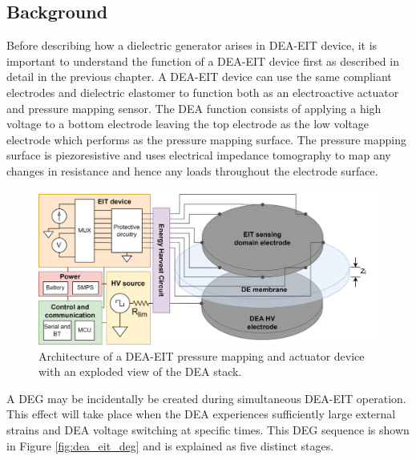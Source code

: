 \subsection{Background} 
\label{subsec:background}
Before describing how a dielectric generator arises in DEA-EIT device, it is important to understand the function of a DEA-EIT device first as  described in detail in the previous chapter. A DEA-EIT device can use the same compliant electrodes and dielectric elastomer to function both as an electroactive actuator and pressure mapping sensor. The DEA function consists of applying a high voltage to a bottom electrode leaving the top electrode as the low voltage electrode which performs as the pressure mapping surface. The pressure mapping surface is piezoresistive and uses electrical impedance tomography to map any changes in resistance and hence any loads throughout the electrode surface. 
\begin{figure}[H]
	\centering
	\hspace{1cm}
	\includegraphics[width=0.8\linewidth]{Figures/DEA-EIT_architecture_v2.png}
	\vspace{0.3cm}
	\caption{Architecture of a DEA-EIT pressure mapping and actuator device with an exploded view of the DEA stack.}
	\label{fig:dea-eit-architecture-w-MCU}
\end{figure}

A DEG may be incidentally be created during simultaneous DEA-EIT operation. This effect will take place when the DEA experiences sufficiently large external strains and DEA voltage switching at specific times. This DEG sequence is shown in Figure \ref{fig:dea_eit_deg} and is explained as five distinct stages.

